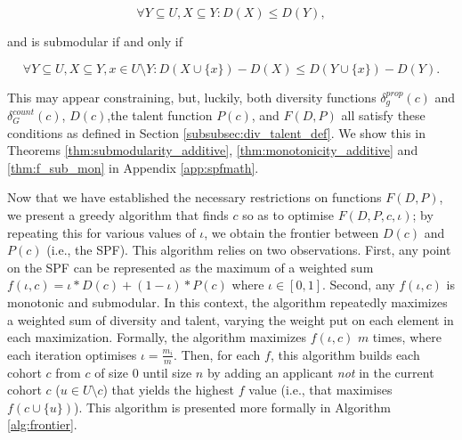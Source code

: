 \begin{equation}
    \label{eq:mononicity}
    \forall Y \subseteq U, X \subseteq Y: D(X)\leq D(Y),
\end{equation}

\noindent and is submodular if and only if

\begin{equation}
    \label{eq:submodularity}
    \forall Y \subseteq U, X \subseteq Y, x \in U \setminus Y: D(X \cup \{x\}) - D(X) \leq D(Y \cup \{x\}) - D(Y).
\end{equation}

This may appear constraining, but, luckily, both diversity functions $\delta_g^{prop}(c)$ and $\delta_G^{count}(c)$, $D(c)$,the talent function $P(c)$, and $F(D,P)$ all satisfy these conditions as defined in Section \ref{subsubsec:div_talent_def}. We show this in Theorems \ref{thm:submodularity_additive}, \ref{thm:monotonicity_additive} and \ref{thm:f_sub_mon} in Appendix \ref{app:spfmath}.

Now that we have established the necessary restrictions on functions $F(D,P)$, we present a greedy algorithm that finds $c$ so as to optimise $F(D, P, c, \iota)$; by repeating this for various values of $\iota$, we obtain the frontier between $D(c)$ and $P(c)$ (i.e., the SPF). This algorithm relies on two observations. First, any point on the SPF can be represented as the maximum of a weighted sum $f(\iota,c) = \iota*D(c) + (1-\iota)*P(c)$ where $\iota \in [0,1]$. Second, any $f(\iota,c)$ is monotonic and submodular. In this context, the algorithm repeatedly maximizes a weighted sum of diversity and talent, varying  the weight put on each element in each maximization. Formally, the algorithm maximizes $f(\iota,c)$ $m$ times, where each iteration optimises $\iota = \frac{m_i}{m}$. Then, for each $f$, this algorithm builds each cohort $c$ from $c$ of size $0$ until size $n$ by adding an applicant \textit{not} in the current cohort $c$ ($u \in U \setminus c$) that yields the highest $f$ value (i.e., that maximises $f(c \cup \{u\})$). This algorithm is presented more formally in Algorithm \ref{alg:frontier}. 

